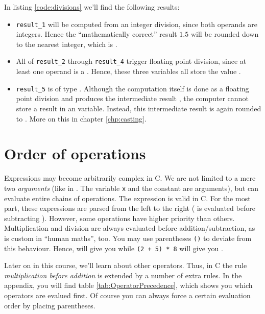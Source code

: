In listing \ref{code:divisions} we'll find the following results:\vspace{-9pt}
\begin{itemize}
\item \texttt{result\_1} will be computed from an integer division, since both operands are integers. Hence the \enquote{mathematically correct} result $1.5$ will be rounded down to 
	the nearest integer, which is .
\item All of \texttt{result\_2} through \texttt{result\_4} trigger floating point division, since at least one operand is a . Hence, these three variables all store the 
	value .
\item \texttt{result\_5} is of type . Although the computation itself is done as a floating point division and produces the intermediate result , the computer cannot 
	store a  result in an  variable. Instead, this intermediate result is again rounded to . More on this in chapter \ref{chp:casting}.
\end{itemize}


\section{Order of operations} \label{sec:OrderOfOperations}
Expressions may become arbitrarily complex in C. We are not limited to a mere two \emph{arguments} (like in . The variable \texttt{x} and the constant  are arguments), but can evaluate entire chains of operations. The expression  is valid in C. For the most part, these expressions are parsed from the left to the right ( is evaluated before subtracting ). However, some operations have higher priority than others. Multiplication and division are always evaluated before addition/subtraction, as is custom in \enquote{human maths}, too. You may use parentheses \texttt{()} to deviate from this behaviour. Hence,  will give you  
while \texttt{(2 + 5) * 8} will give you .

Later on in this course, we'll learn about other operators. Thus, in C the rule \emph{multiplication before addition} is extended by a number of extra rules. In the appendix, you will find table \ref{tab:OperatorPrecedence}, which shows you which operators are evalued first. Of course you can always force a certain evaluation order by placing parentheses.

